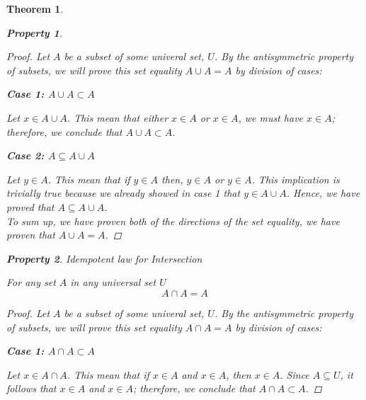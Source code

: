 \documentclass{book}
\newtheorem{theorem}{Theorem}[section]
\newtheorem{property}{Property}[theorem]
\theoremstyle{definition}
\theoremstyle{remark}
\begin{document}
\begin{theorem}
\begin{property}
        \begin{proof}
            Let $A$ be a subset of some univeral set, $U$. By the antisymmetric property of subsets, we will prove this set equality $A \cup A = A$ by division of cases:
            
            \begin{flushleft} \textbf{Case 1: $A \cup A \subset A$} \end{flushleft}
                Let $x \in A \cup A$. This mean that either $x \in A$ or $x \in A$, we must have $x \in A$; therefore, we conclude that $A \cup A \subset A$.
            
            \begin{flushleft} \textbf{Case 2: $A \subseteq A \cup A$} \end{flushleft} 
                Let $y \in A$. This mean that if  $y \in A$ then, $y \in A$ or $y \in A$. This implication  is trivially true because we already showed in \textit{case 1} that $y \in A \cup A$. Hence, we have proved that $A \subseteq A \cup A$. \\
            
            To sum up, we have proven both of the directions of the set equality, we have proven that $A \cup A = A$. 
        \end{proof}
    \end{property}
    
    
    
    \begin{property}
    Idempotent law for Intersection \\
        \begin{tcolorbox}
            For any set $A$ in any universal set $U$
                \begin{equation*}
                    A \cap A = A
                \end{equation*}
        \end{tcolorbox}
    
        \begin{proof}
            Let $A$ be a subset of some univeral set, $U$. By the antisymmetric property of subsets, we will prove this set equality $A \cap A = A$ by division of cases:
            
            \begin{flushleft} \textbf{Case 1: $A \cap A \subset A$} \end{flushleft}
                Let $x \in A \cap A $. This mean that if $x \in A$ and $x \in A$, then $x \in A$. Since $A \subseteq U$, it follows that $x \in A$ and $x \in A$; therefore, we conclude that $A \cap A \subset A$.
            

\end{proof}
\end{property}
\end{theorem}
\end{document}
